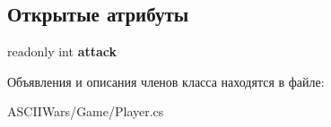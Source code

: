 \subsection*{Открытые атрибуты}
\begin{DoxyCompactItemize}
\item 
\hypertarget{class_a_s_c_i_i_wars_1_1_game_1_1_weapon_a70166ce84757794de92f0a52de55bb04}{}\label{class_a_s_c_i_i_wars_1_1_game_1_1_weapon_a70166ce84757794de92f0a52de55bb04} 
readonly int {\bfseries attack}
\end{DoxyCompactItemize}


Объявления и описания членов класса находятся в файле\+:\begin{DoxyCompactItemize}
\item 
A\+S\+C\+I\+I\+Wars/\+Game/Player.\+cs\end{DoxyCompactItemize}
